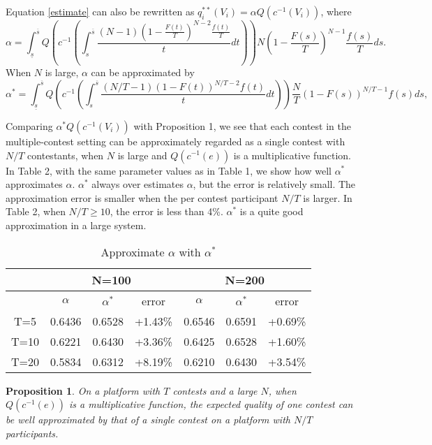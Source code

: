 \documentclass[12pt]{article}
\newtheorem{Proposition}{Proposition}
\begin{document}
Equation \ref{estimate} can also be rewritten as $q_{i}^{**}(V_{i})=\alpha Q(c^{-1}(V_{i}))$,
where
\begin{equation}
\alpha=\int_{\underline{s}}^{\overline{s}}Q\left(c^{-1}\left(\int_{s}^{\overline{s}}\frac{(N-1)(1-\frac{F(t)}{T})^{N-2}\frac{f(t)}{T}}{t}dt\right)\right)N\left(1-\frac{F(s)}{T}\right)^{N-1}\frac{f(s)}{T}ds.\label{multi_quality}
\end{equation}
When $N$ is large, $\alpha$ can be approximated by
\begin{equation}
\alpha^{*}=\int_{\underline{s}}^{\overline{s}}Q\left(c^{-1}\left(\int_{s}^{\overline{s}}\frac{(N/T-1)(1-F(t))^{N/T-2}f(t)}{t}dt\right)\right)\frac{N}{T}\left(1-F(s)\right)^{N/T-1}f(s)ds,
\end{equation}

Comparing $\alpha^* Q(c^{-1}(V_{i}))$ with Proposition 1, we see that each contest in the multiple-contest setting can be approximately regarded as a single contest with $N/T$ contestants, when $N$ is large and $Q(c^{-1}(e))$ is a multiplicative function. In Table 2, with the same parameter values as in Table 1, we show how well $\alpha^{*}$ approximates $\alpha$. $\alpha^{*}$ always over estimates
$\alpha$, but the error is relatively small. The approximation error is
smaller when the per contest participant $N/T$ is larger. In Table 2, when $N/T \geq 10$,
the error is less than 4\%. $\alpha^{*}$ is a quite good approximation
in a large system.
\begin{table}
\centering
\begin{tabular}{|c|c|c|c|c|c|c|}
\hline
 &  \multicolumn{3}{c|}{N=100} & \multicolumn{3}{c|}{N=200}\tabularnewline
\hline
     & $\alpha$  & $\alpha^{*}$  & error  & $\alpha$  & $\alpha^{*}$  & error\tabularnewline
\hline
\hline
T=5   & 0.6436  & 0.6528  & +1.43\%  & 0.6546  & 0.6591  & +0.69\%\tabularnewline
\hline
T=10    & 0.6221  & 0.6430  & +3.36\%  & 0.6425  & 0.6528  & +1.60\%\tabularnewline
\hline
T=20   & 0.5834  & 0.6312  & +8.19\%  & 0.6210  & 0.6430  & +3.54\%\tabularnewline
\hline
\end{tabular}\caption{Approximate $\alpha$ with $\alpha^*$}
\end{table}


\begin{Proposition} On a platform with $T$ contests and a large $N$, when $Q(c^{-1}(e))$ is a multiplicative function, the expected quality of one contest can be well approximated by that of a single contest on a platform with $N/T$ participants.
\end{Proposition}
\end{document}
